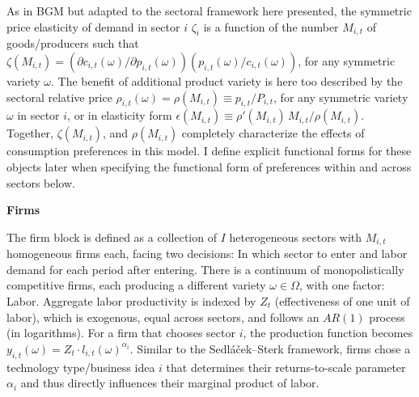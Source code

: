 \documentclass[a4paper,12pt]{article} %
\numberwithin{equation}{section} %
\numberwithin{figure}{section}
\numberwithin{table}{section}
\begin{document}
As in BGM but adapted to the sectoral framework here presented, the symmetric price elasticity of demand in sector $i$ $\zeta_i$  is a function 
of the number $M_{i,t}$ of goods/producers such that $\zeta (M_{i,t}) = (\partial c_{i,t}(\omega)/\partial p_{i,t}(\omega))(p_{i,t}(\omega)/c_{i,t}(\omega))$, 
for any symmetric variety $\omega$. The benefit of additional product variety is here too described by the sectoral relative price $\rho_{i,t}(\omega) =
\rho(M_{i,t}) \equiv p_{i,t}/P_{i,t}$, for any symmetric variety $\omega$ in sector $i$, or in elasticity form $\epsilon(M_{i,t}) \equiv \rho'(M_{i,t})\,M_{i,t}/\rho(M_{i,t})$. 
Together, $\zeta(M_{i,t})$, and $\rho (M_{i,t})$ completely 
characterize the effects of consumption preferences in this model. I define explicit functional forms for these objects later when specifying the 
functional form of preferences within and across sectors below.


\medskip
\medskip
\noindent\textbf{Firms}
\medskip

The firm block is defined as a collection of $I$ heterogeneous sectors with $M_{i,t}$ homogeneous firms each, 
facing two decisions: In which sector to enter and labor demand for each period after entering. There is a continuum of monopolistically competitive
firms, each producing a different variety $\omega \in \Omega$, with one factor: Labor. 
Aggregate labor productivity is indexed by $Z_t$ (effectiveness of one unit of labor), which is 
exogenous, equal across sectors, and follows an $AR(1)$ process (in logarithms). For a firm that chooses sector $i$, the production function becomes
$y_{i,t}(\omega) = Z_t \cdot l_{i,t}(\omega)^{\alpha_i}$. Similar to the Sedláček–Sterk framework, firms chose a technology type/business idea $i$ 
that determines their returns-to-scale parameter $\alpha_i$ and thus directly influences their marginal product of labor.
\end{document}

